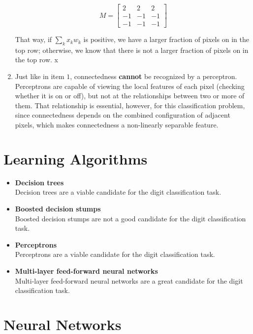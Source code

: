 \documentclass{article}
\begin{document}
\begin{enumerate}
$$M=\begin{bmatrix}
      2&2&2           \\[0.3em]
      -1&-1&-1 \\[0.3em]
       -1&-1&-1
     \end{bmatrix}$$

That way, if $\sum_k{x_kw_k}$ is positive, we have a larger fraction of pixels on in the top row; otherwise, we know that there is not a larger fraction of pixels on in the top row.
x
\item %
Just like in item $1$, connectedness \textbf{cannot} be recognized by a perceptron. Perceptrons are capable of viewing the local features of each pixel (checking whether it is on or off), but not at the relationships between two or more of them. That relationship is essential, however, for this classification problem, since connectedness depends on the combined configuration of adjacent pixels, which makes connectedness a non-linearly separable feature.

\end{enumerate}

\section{Learning Algorithms}
 
\begin{itemize}

\item \textbf{Decision trees} \\ 
Decision trees are a viable candidate for the digit classification task.

\item \textbf{Boosted decision stumps} \\
Boosted decision stumps are not a good candidate for the digit classification task.

\item \textbf{Perceptrons} \\
Perceptrons are a viable candidate for the digit classification task.

\item \textbf{Multi-layer feed-forward neural networks} \\
Multi-layer feed-forward neural networks are a great candidate for the digit classification task.

\end{itemize}

\section{Neural Networks}
\end{document}
